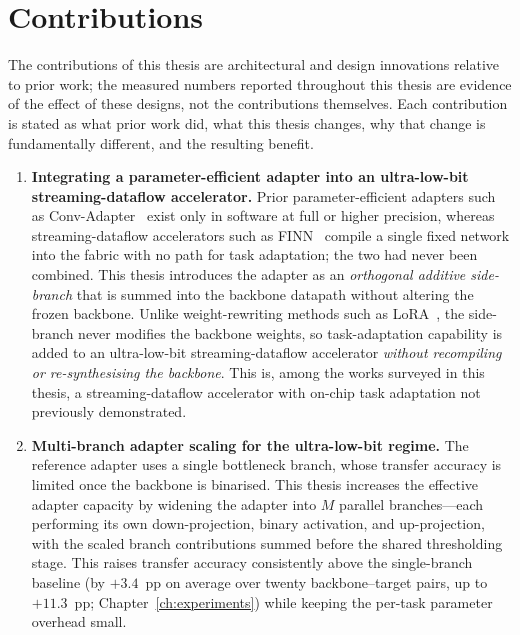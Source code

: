 \documentclass[12pt, a4paper]{report}
\numberwithin{equation}{chapter}
\numberwithin{figure}{chapter}
\numberwithin{table}{chapter}
\numberwithin{algorithm}{chapter}
\begin{document}
\section{Contributions}

The contributions of this thesis are architectural and design innovations relative to prior work; the measured numbers reported throughout this thesis are evidence of the effect of these designs, not the contributions themselves. Each contribution is stated as what prior work did, what this thesis changes, why that change is fundamentally different, and the resulting benefit.

\begin{enumerate}
  \item \textbf{Integrating a parameter-efficient adapter into an ultra-low-bit streaming-dataflow accelerator.} Prior parameter-efficient adapters such as Conv-Adapter~\cite{Chen2024ConvAdapter} exist only in software at full or higher precision, whereas streaming-dataflow accelerators such as FINN~\cite{Umuroglu2017FINN} compile a single fixed network into the fabric with no path for task adaptation; the two had never been combined. This thesis introduces the adapter as an \emph{orthogonal additive side-branch} that is summed into the backbone datapath without altering the frozen backbone. Unlike weight-rewriting methods such as LoRA~\cite{Hu2022LoRA}, the side-branch never modifies the backbone weights, so task-adaptation capability is added to an ultra-low-bit streaming-dataflow accelerator \emph{without recompiling or re-synthesising the backbone}. This is, among the works surveyed in this thesis, a streaming-dataflow accelerator with on-chip task adaptation not previously demonstrated.

  \item \textbf{Multi-branch adapter scaling for the ultra-low-bit regime.} The reference adapter uses a single bottleneck branch, whose transfer accuracy is limited once the backbone is binarised. This thesis increases the effective adapter capacity by widening the adapter into $M$ parallel branches---each performing its own down-projection, binary activation, and up-projection, with the scaled branch contributions summed before the shared thresholding stage. This raises transfer accuracy consistently above the single-branch baseline (by $+3.4$~pp on average over twenty backbone--target pairs, up to $+11.3$~pp; Chapter~\ref{ch:experiments}) while keeping the per-task parameter overhead small.


\end{enumerate}
\end{document}
